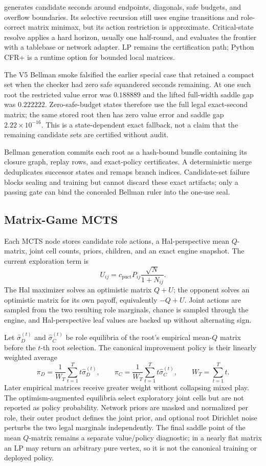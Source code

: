 \documentclass[11pt]{article}
\begin{document}
 generates candidate seconds around endpoints,
diagonals, safe budgets, and overflow boundaries. Its selective recursion
still uses engine transitions and role-correct matrix minimax, but its action
restriction is approximate. Critical-state resolve applies a hard horizon,
usually one half-round, and evaluates the frontier with a tablebase or network
adapter. LP remains the certification path; Python CFR+ is a runtime option for
bounded local matrices.

The V5 Bellman smoke falsified the earlier special case that retained a compact
set when the checker had zero safe squandered seconds remaining. At one such
root the restricted value error was \(0.188889\) and the lifted full-width
saddle gap was \(0.222222\). Zero-safe-budget states therefore use the full
legal exact-second matrix; the same stored root then has zero value error and
saddle gap \(2.22\times10^{-16}\). This is a state-dependent exact fallback,
not a claim that the remaining candidate sets are certified without audit.

Bellman generation commits each root as a hash-bound bundle containing its
closure graph, replay rows, and exact-policy certificates. A deterministic
merge deduplicates successor states and remaps branch indices. Candidate-set
failure blocks sealing and training but cannot discard these exact artifacts;
only a passing gate can bind the concealed Bellman ruler into the one-use seal.

\subsection{Matrix-Game MCTS}

Each MCTS node stores candidate role actions, a Hal-perspective mean
\(Q\)-matrix, joint cell counts, priors, children, and an exact engine
snapshot. The current exploration term is
\[
U_{ij}=c_{\mathrm{puct}}P_{ij}
\frac{\sqrt{N}}{1+N_{ij}}.
\]
The Hal maximizer solves an optimistic matrix \(Q+U\); the opponent solves an
optimistic matrix for its own payoff, equivalently \(-Q+U\). Joint actions are
sampled from the two resulting role marginals, chance is sampled through the
engine, and Hal-perspective leaf values are backed up without alternating sign.

Let \(\widehat\sigma_D^{(t)}\) and
\(\widehat\sigma_C^{(t)}\) be role equilibria of the root's empirical
mean-\(Q\) matrix before the \(t\)-th root selection. The canonical improvement
policy is their linearly weighted average
\[
\pi_D=\frac{1}{W_T}\sum_{t=1}^{T}t\widehat\sigma_D^{(t)},
\qquad
\pi_C=\frac{1}{W_T}\sum_{t=1}^{T}t\widehat\sigma_C^{(t)},
\qquad
W_T=\sum_{t=1}^{T}t.
\]
Later empirical matrices receive greater weight without collapsing mixed play.
The optimism-augmented equilibria select exploratory joint cells but are not
reported as policy probability. Network priors are masked and normalized per
role, their outer product defines the joint prior, and optional root Dirichlet
noise perturbs the two legal marginals independently. The final saddle point
of the mean \(Q\)-matrix remains a separate value/policy diagnostic; in a
nearly flat matrix an LP may return an arbitrary pure vertex, so it is not the
canonical training or deployed policy.
\end{document}
